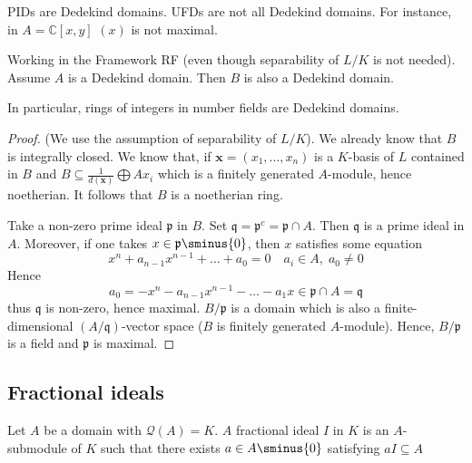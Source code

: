 \begin{example}{}
    PIDs are Dedekind domains. UFDs are not all Dedekind domains. For instance,
    in \(A = \mathbb{C}[x, y] \) \((x)\) is not maximal.
\end{example}

\begin{theorem}{}
    Working in the Framework RF (even though separability of \(L / K\) is not
    needed). Assume \(A\) is a Dedekind domain. Then \(B\) is also a Dedekind
    domain.
\end{theorem}
\begin{remark}{}
    In particular, rings of integers in number fields are Dedekind domains.
\end{remark}
\begin{proof}{}
    (We use the assumption of separability of \(L / K\)). We already know that
    \(B\) is integrally closed. We know that, if \(\mathbf{x} = {(x_{1}, \dots,
    x_{n})}\) is a \(K\)-basis of \(L\) contained in \(B\) and \(B \subseteq
    \frac{1}{d{(\mathbf{x} )}} \bigoplus A x_{i} \) which is a finitely
    generated \(A\)-module, hence noetherian. It follows that \(B\) is a
    noetherian ring.

    Take a non-zero prime ideal \(\mathfrak{p}\) in \(B\). Set \(\mathfrak{q} =
    \mathfrak{p}^{c} = \mathfrak{p} \cap A\). Then \(\mathfrak{q}\) is a prime
    ideal in \(A\). Moreover, if one takes \(x \in \mathfrak{p} \sminus \{0\}
    \), then \(x\) satisfies some equation
    \[
      x^{n} + a_{n-1} x^{n-1} + \dots + a_{0} = 0 \quad a_{i} \in  A, \; a_{0}
      \neq 0
    \]
    Hence 
    \[
      a_{0} = -x^{n} - a_{n-1} x^{n-1} - \dots - a_{1} x \in  \mathfrak{p} \cap
      A = \mathfrak{q}
    \]
    thus \(\mathfrak{q}\) is non-zero, hence maximal. 
    \(B / \mathfrak{p}\) is a domain which is also a finite-dimensional \({(A /
    \mathfrak{q})}\)-vector space (\(B\) is finitely generated \(A\)-module).
    Hence, \(B / \mathfrak{p}\) is a field and \(\mathfrak{p}\) is maximal.
\end{proof}

\subsection{Fractional ideals}
\begin{definition}{}
    Let \(A\) be a domain with \(\mathcal{Q}{(A)} = K\). \(A\) fractional ideal
    \(I\) in \(K\) is an \(A\)-submodule of \(K\) such that there exists \(a \in
    A \sminus \{0\} \) satisfying \(aI \subseteq A \) 
\end{definition}

